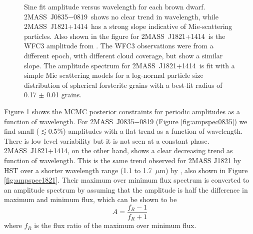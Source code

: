 \documentclass[twocolumn]{aastex6}
\newcommand{\sha}{2MASS~J0835$-$0819}
\newcommand{\shb}{2MASS~J1821+1414}
\begin{document}
\begin{figure}
\centering
{}
	\caption{Sine fit amplitude versus wavelength for each brown dwarf. \sha\ shows no clear trend in wavelength, while \shb\ has a strong slope indicative of Mie-scattering particles.
	 Also shown in the figure for \shb\ is the WFC3 amplitude from \citet{2015ApJ...798L..13Y}. The WFC3 observations were from a different epoch, with different cloud coverage, but show a similar slope.
	 The amplitude spectrum for \shb\ is fit with a simple Mie scattering models for a log-normal particle size distribution of spherical forsterite grains with a best-fit radius of 0.17 $\pm$ 0.01 grains.}
	\label{fig:ampSpec}
\end{figure} 

Figure \ref{fig:ampSpec} shows the MCMC posterior constraints for periodic amplitudes as a function of wavelength.
For {\sha} (Figure \ref{fig:ampspec0835}) we find small ($\lesssim 0.5\%$) amplitudes with a flat trend as a function of wavelength.
There is low level variability but it is not seen at a constant phase.
\shb, on the other hand, shows a clear decreasing trend as function of wavelength.
This is the same trend observed for 2MASS J1821 by HST over a shorter wavelength range (1.1 to 1.7~$\mu$m) by \citet{2015ApJ...798L..13Y}, also shown in Figure \ref{fig:ampspec1821}.
Their maximum over minimum flux spectrum is converted to an amplitude spectrum by assuming that the amplitude is half the difference in maximum and minimum flux, which can be shown to be 
\begin{equation}
A  = \frac{f_R - 1}{f_R + 1}
\end{equation}\label{eq:ampFromRatio}
where $f_R$ is the flux ratio of the maximum over minimum flux.
\end{document}
